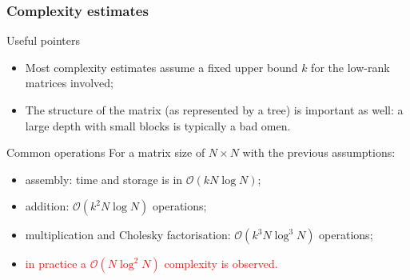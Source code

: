 
\begin{frame}
\frametitle{Complexity estimates}

\begin{alert}{Useful pointers}
\begin{itemize}
\item Most complexity estimates assume a fixed upper bound $k$ for the 
low-rank matrices involved;
\item The structure of the matrix (as represented by a tree) is 
important as well: a large depth with small blocks is typically a bad omen.
\end{itemize}
\end{alert}

\begin{block}{Common operations}
For a matrix size of $N \times N$ with the previous assumptions:
\begin{itemize}
\item assembly:  time and storage is in $\mathcal{O}(kN \log N)$;
\item addition: $\mathcal{O}(k^2N \log N )$ operations;
\item multiplication and Cholesky factorisation: $\mathcal{O}(k^3 N \log^3 N )$ operations;
\item \textcolor{red}{in practice a $\mathcal{O}(N \log^2 N)$ complexity is observed.}
\end{itemize}
\end{block}

\end{frame}

